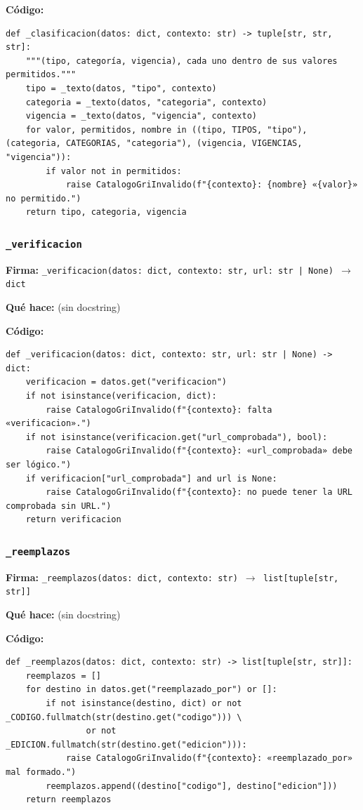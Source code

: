 \documentclass[11pt,a4paper]{article}
\begin{document}
\textbf{Código:}
\begin{lstlisting}
def _clasificacion(datos: dict, contexto: str) -> tuple[str, str, str]:
    """(tipo, categoría, vigencia), cada uno dentro de sus valores permitidos."""
    tipo = _texto(datos, "tipo", contexto)
    categoria = _texto(datos, "categoria", contexto)
    vigencia = _texto(datos, "vigencia", contexto)
    for valor, permitidos, nombre in ((tipo, TIPOS, "tipo"), (categoria, CATEGORIAS, "categoria"), (vigencia, VIGENCIAS, "vigencia")):
        if valor not in permitidos:
            raise CatalogoGriInvalido(f"{contexto}: {nombre} «{valor}» no permitido.")
    return tipo, categoria, vigencia
\end{lstlisting}

\subsubsection*{\texttt{\_verificacion}}
\textbf{Firma:} \texttt{\_verificacion(datos: dict, contexto: str, url: str | None) $\rightarrow$ dict}

\textbf{Qué hace:} (sin docstring)

\textbf{Código:}
\begin{lstlisting}
def _verificacion(datos: dict, contexto: str, url: str | None) -> dict:
    verificacion = datos.get("verificacion")
    if not isinstance(verificacion, dict):
        raise CatalogoGriInvalido(f"{contexto}: falta «verificacion».")
    if not isinstance(verificacion.get("url_comprobada"), bool):
        raise CatalogoGriInvalido(f"{contexto}: «url_comprobada» debe ser lógico.")
    if verificacion["url_comprobada"] and url is None:
        raise CatalogoGriInvalido(f"{contexto}: no puede tener la URL comprobada sin URL.")
    return verificacion
\end{lstlisting}

\subsubsection*{\texttt{\_reemplazos}}
\textbf{Firma:} \texttt{\_reemplazos(datos: dict, contexto: str) $\rightarrow$ list[tuple[str, str]]}

\textbf{Qué hace:} (sin docstring)

\textbf{Código:}
\begin{lstlisting}
def _reemplazos(datos: dict, contexto: str) -> list[tuple[str, str]]:
    reemplazos = []
    for destino in datos.get("reemplazado_por") or []:
        if not isinstance(destino, dict) or not _CODIGO.fullmatch(str(destino.get("codigo"))) \
                or not _EDICION.fullmatch(str(destino.get("edicion"))):
            raise CatalogoGriInvalido(f"{contexto}: «reemplazado_por» mal formado.")
        reemplazos.append((destino["codigo"], destino["edicion"]))
    return reemplazos
\end{lstlisting}
\end{document}
